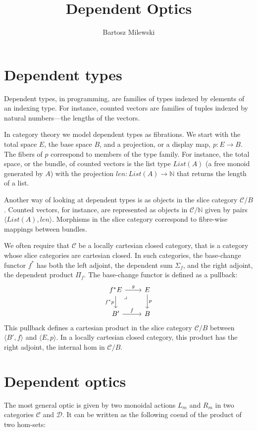 \documentclass[11pt]{amsart}
\author{Bartosz Milewski}
\title{Dependent Optics}
\begin{document}
\maketitle{}

\section{Dependent types}

Dependent types, in programming, are families of types indexed by elements of an indexing type. For instance, counted vectors are families of tuples indexed by natural numbers---the lengths of the vectors.

In category theory we model dependent types as fibrations. We start with the total space $E$, the base space $B$, and a projection, or a display map, $p \colon E \to B$. The fibers of $p$ correspond to members of the type family. For instance, the total space, or the bundle, of counted vectors is the list type $\mathit{List} (A)$ (a free monoid generated by $A$) with the projection $\mathit{len} \colon \mathit{List} (A) \to \mathbb{N}$ that returns the length of a list.

Another way of looking at dependent types is as objects in the slice category $\mathcal{C}/B$. Counted vectors, for instance, are represented as objects in $\mathcal{C}/\mathbb{N}$ given by pairs $\langle \mathit{List} (A), \mathit{len} \rangle$.   Morphisms in the slice category correspond to fibre-wise mappings between bundles.

We often require that $\mathcal{C}$ be a locally cartesian closed category, that is a category whose slice categories are cartesian closed. In such categories, the base-change functor $f^*$ has both the left adjoint, the dependent sum $\Sigma_f$, and the right adjoint, the dependent product $\Pi_f$. The base-change functor is defined as a pullback:
\[
 \begin{tikzcd}
f^* E
\arrow[dr, phantom,  , very near start, "\lrcorner"]
 \arrow[d, "f^*p"']
 \arrow[r, "g"]
 & E
 \arrow[d, "p"]
 \\
 B'
 \arrow[r, "f"]
 &B
  \end{tikzcd}
\]
This pullback defines a cartesian product in the slice category $\mathcal{C}/B$ between $\langle B', f \rangle$ and $\langle E, p \rangle$. In a locally cartesian closed category, this product has the right adjoint, the internal hom in $\mathcal{C}/B$.

\section{Dependent optics}
The most general optic is given by two monoidal actions $L_m$ and $R_m$ in two categories  $\mathcal{C}$ and $ \mathcal{D}$. It can be written as the following coend of the product of two hom-sets:
\end{document}
